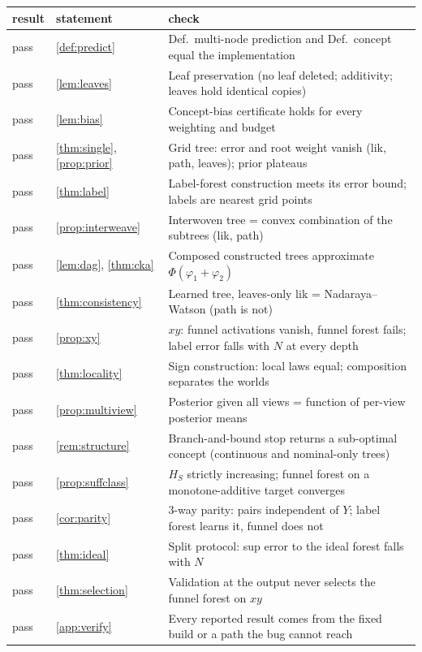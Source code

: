 \begin{tabular}{@{}llp{9.2cm}@{}}\toprule
result & statement & check\\\midrule
pass & \cref{def:predict} & Def.~multi-node prediction and Def.~concept equal the implementation\\
pass & \cref{lem:leaves} & Leaf preservation (no leaf deleted; additivity; leaves hold identical copies)\\
pass & \cref{lem:bias} & Concept-bias certificate holds for every weighting and budget\\
pass & \cref{thm:single}, \cref{prop:prior} & Grid tree: error and root weight vanish (lik, path, leaves); prior plateaus\\
pass & \cref{thm:label} & Label-forest construction meets its error bound; labels are nearest grid points\\
pass & \cref{prop:interweave} & Interwoven tree = convex combination of the subtrees (lik, path)\\
pass & \cref{lem:dag}, \cref{thm:cka} & Composed constructed trees approximate $\Phi(\varphi_1+\varphi_2)$\\
pass & \cref{thm:consistency} & Learned tree, leaves-only lik = Nadaraya--Watson (path is not)\\
pass & \cref{prop:xy} & $xy$: funnel activations vanish, funnel forest fails; label error falls with $N$ at every depth\\
pass & \cref{thm:locality} & Sign construction: local laws equal; composition separates the worlds\\
pass & \cref{prop:multiview} & Posterior given all views = function of per-view posterior means\\
pass & \cref{rem:structure} & Branch-and-bound stop returns a sub-optimal concept (continuous and nominal-only trees)\\
pass & \cref{prop:suffclass} & $H_S$ strictly increasing; funnel forest on a monotone-additive target converges\\
pass & \cref{cor:parity} & 3-way parity: pairs independent of $Y$; label forest learns it, funnel does not\\
pass & \cref{thm:ideal} & Split protocol: sup error to the ideal forest falls with $N$\\
pass & \cref{thm:selection} & Validation at the output never selects the funnel forest on $xy$\\
pass & \cref{app:verify} & Every reported result comes from the fixed build or a path the bug cannot reach\\

\end{tabular}

